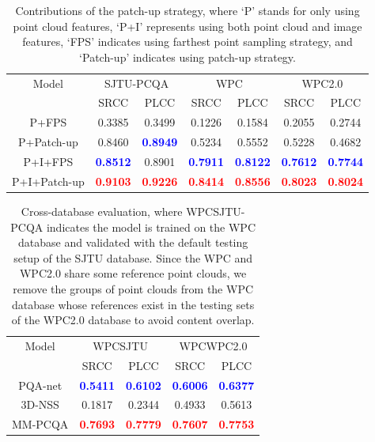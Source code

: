 \documentclass{article}
\begin{document}
\begin{table}[tb]\small

\renewcommand\tabcolsep{2pt}
    \centering
    \begin{tabular}{c|cc|cc|cc}
    \toprule
    \multirow{2}{*}{Model}  & \multicolumn{2}{c|}{SJTU-PCQA} & \multicolumn{2}{c|}{WPC} & \multicolumn{2}{c}{WPC2.0}\\ \cline{2-7}
            & SRCC    & PLCC   & SRCC   & PLCC & SRCC   & PLCC\\ \hline
        P+FPS         &0.3385 &0.3499 & 0.1226 & 0.1584 & 0.2055 & 0.2744\\
        P+Patch-up    &0.8460 &\bf\textcolor{blue}{0.8949} & 0.5234 & 0.5552 & 0.5228 & 0.4682\\ 
        P+I+FPS       &\bf\textcolor{blue}{0.8512} &{0.8901} & \bf\textcolor{blue}{0.7911} & \bf\textcolor{blue}{0.8122} & \bf\textcolor{blue}{0.7612} & \bf\textcolor{blue}{0.7744}\\
        P+I+Patch-up  & \bf\textcolor{red}{0.9103}   & \bf\textcolor{red}{0.9226}    &\bf\textcolor{red}{0.8414}    & \bf\textcolor{red}{0.8556}     &\bf\textcolor{red}{0.8023}    & \bf\textcolor{red}{0.8024} \\     
    \bottomrule
    \end{tabular}
    \caption{Contributions of the patch-up strategy, where `P' stands for only using point cloud features, `P+I' represents using both point cloud and image features, `FPS' indicates using farthest point sampling strategy, and `Patch-up' indicates using patch-up strategy. }
    \label{tab:patch}
\end{table}


\begin{table}[t]\small
    \centering
    
    \begin{tabular}{c|cc|cc}
    \toprule
    \multirow{2}{*}{Model}  & \multicolumn{2}{c|}{WPCSJTU} & \multicolumn{2}{c}{WPCWPC2.0} \\ \cline{2-5}
            & SRCC    & PLCC   & SRCC   & PLCC \\ \hline
        PQA-net       & \bf\textcolor{blue}{0.5411} & \bf\textcolor{blue}{0.6102} & \bf\textcolor{blue}{0.6006} & \bf\textcolor{blue}{0.6377}\\
        3D-NSS        & 0.1817 & 0.2344 & 0.4933 & 0.5613\\ 
        MM-PCQA       & \bf\textcolor{red}{0.7693}   & \bf\textcolor{red}{0.7779}    &\bf\textcolor{red}{0.7607}    & \bf\textcolor{red}{0.7753}\\     
    \bottomrule
    \end{tabular}
    \caption{Cross-database evaluation, where WPCSJTU-PCQA indicates the model is trained on the WPC database and validated with the default testing setup of the SJTU database. Since the WPC and WPC2.0 share some reference point clouds, we remove the groups of point clouds from the WPC database whose references exist in the testing sets of the WPC2.0 database to avoid content overlap.}
    \label{tab:crossdatabase}
    \vspace{-0.2cm}
\end{table}
\end{document}
